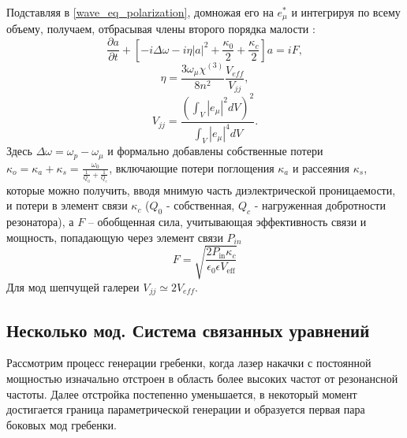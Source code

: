 Подставляя в \eqref{wave_eq_polarization}, домножая его на $e_\mu^*$ и интегрируя по всему объему, получаем, отбрасывая члены второго порядка малости \cite{Gorodetsky}:
\begin{equation}
\frac{\partial a}{\partial t}+[-i\Delta\omega-i\eta|a|^2+\frac{\kappa_0}{2}+\frac{\kappa_c}{2}]a=iF,
\end{equation}
\begin{equation}
\eta=\frac{3\omega_\mu\chi^{(3)}}{8n^2}\frac{V_{eff}}{V_{jj}},
\end{equation}
\begin{equation}
V_{jj}=\frac{(\int_V|e_\mu|^2dV)^2}{\int_V|e_\mu|^4dV}.
\end{equation}
Здесь $\Delta\omega=\omega_p-\omega_\mu$ и формально добавлены собственные потери $\kappa_o=\kappa_a+\kappa_s=\frac{\omega_0}{\frac{1}{Q_0}+\frac{1}{Q_c}}$, включающие потери поглощения $\kappa_a$ и рассеяния $\kappa_s$, которые можно получить, вводя мнимую часть диэлектрической проницаемости, и потери в элемент связи $\kappa_c$ ($Q_0$ - собственная, $Q_c$ - нагруженная добротности резонатора), а $F$ -- обобщенная сила, учитывающая эффективность связи и мощность, попадающую через элемент связи $P_{in}$
\begin{equation}
F=\sqrt{\frac{2P_{\text{in}}\kappa_c}{\epsilon_0\epsilon V_{\text{eff}}}}
\end{equation}
Для мод шепчущей галереи \cite{Gorodetsky} $V_{jj}\simeq 2V_{eff}$.

\subsection{Несколько мод. Система связанных уравнений}
Рассмотрим процесс генерации гребенки, когда лазер накачки с постоянной мощностью изначально отстроен в область более высоких частот от резонансной частоты. Далее отстройка постепенно уменьшается, в некоторый момент достигается граница параметрической генерации и образуется первая пара боковых мод гребенки.

